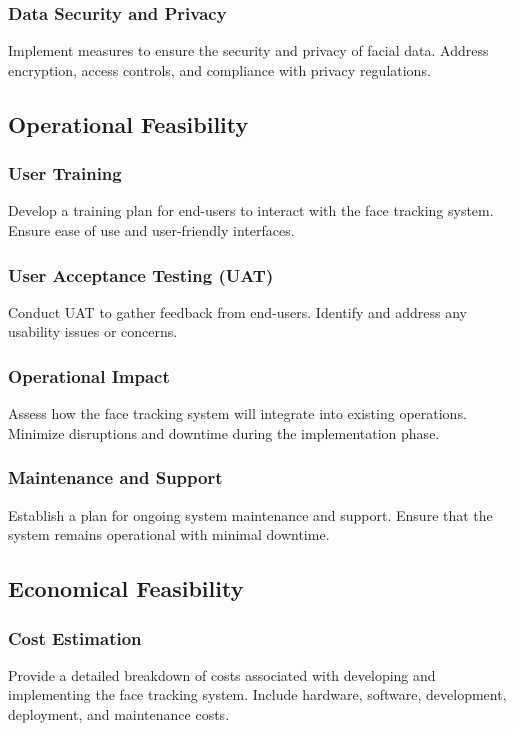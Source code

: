 \subsubsection{Data Security and Privacy}
Implement measures to ensure the security and privacy of facial data.
Address encryption, access controls, and compliance with privacy regulations.

\subsection{Operational Feasibility}
\subsubsection{User Training}
Develop a training plan for end-users to interact with the face tracking system.
Ensure ease of use and user-friendly interfaces.

\subsubsection{User Acceptance Testing (UAT)}
Conduct UAT to gather feedback from end-users.
Identify and address any usability issues or concerns.

\subsubsection{Operational Impact}
Assess how the face tracking system will integrate into existing operations.
Minimize disruptions and downtime during the implementation phase.

\subsubsection{Maintenance and Support}
Establish a plan for ongoing system maintenance and support.
Ensure that the system remains operational with minimal downtime.

\subsection{Economical Feasibility}
\subsubsection{Cost Estimation}
Provide a detailed breakdown of costs associated with developing and implementing the face tracking system.
Include hardware, software, development, deployment, and maintenance costs.
